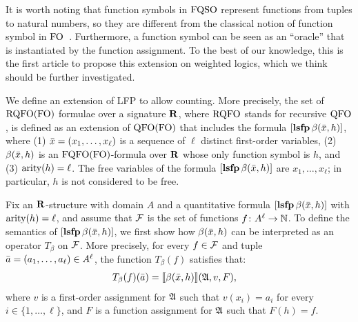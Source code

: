 It is worth noting that function symbols in ${\rm FQSO}$ represent functions from tuples to natural numbers, so they are different from the classical notion of function symbol in ${\rm FO}$~\cite{L04}. 
Furthermore, a function symbol can be seen as an ``oracle'' that is instantiated by the function assignment. 
To the best of our knowledge, this is the first article to propose this extension on weighted logics, which we think should be further investigated. 

We define an extension of LFP \cite{I86,vardi1982complexity} to allow counting. 
More precisely, the set of ${\rm RQFO}({\rm FO})$ formulae over a signature $\mathbf{R}$, where ${\rm RQFO}$ stands for recursive ${\rm QFO}$, is defined as an extension of ${\rm QFO}({\rm FO})$ that includes the formula $[{\bf lsfp} \, \beta(\bar{x}, h)]$, where (1) $\bar{x} = (x_1, \ldots, x_\ell)$ is a sequence of $\ell$ distinct first-order variables, (2) $\beta(\bar{x}, h)$ is an ${\rm FQFO}({\rm FO})$-formula over $\mathbf{R}$ whose only function symbol is $h$, and (3) ${\rm arity}(h) = \ell$. The free variables of the formula $[{\bf lsfp} \, \beta(\bar{x},h)]$ are $x_1, \ldots, x_\ell$; in particular, $h$ is not considered to be free.

Fix an $\mathbf{R}$-structure with domain $A$ and a quantitative formula $[{\bf lsfp} \, \beta(\bar{x},h)]$ with ${\rm arity}(h) = \ell$, and assume that $\mathcal{F}$ is the set of functions $f\colon A^\ell \to \mathbb{N}$. To define the semantics of $[{\bf lsfp} \, \beta(\bar{x},h)]$, we first show how $\beta(\bar{x},h)$ can be interpreted as an operator $T_{\beta}$ on $\mathcal{F}$. More precisely, for every $f \in \mathcal{F}$ and tuple $\bar{a} = (a_1, \ldots, a_{\ell}) \in A^\ell$, the function $T_{\beta}(f)$ satisfies that:
\begin{align*}
T_{\beta}(f)(\bar{a}) &= {\llbracket{}{\beta(\bar{x}, h)}\rrbracket}(\mathfrak{A},v,F),
\end{align*}
where $v$ is a first-order assignment  for $\mathfrak{A}$ such that $v(x_i) = a_i$ for every $i \in \{1, \ldots, \ell\}$, and $F$ is a function assignment for $\mathfrak{A}$ such that $F(h) = f$. 

